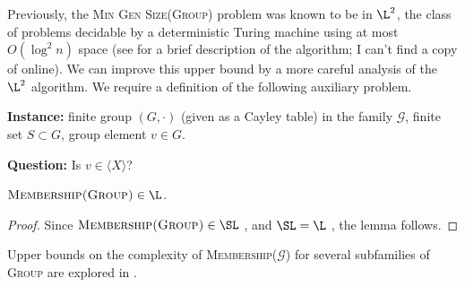 \documentclass{article}
\newcommand{\gen}[1]{{\langle #1 \rangle}}
\begin{document}


Previously, the \textsc{Min Gen Size(Group)} problem was known to be in $\L^2$, the class of problems decidable by a deterministic Turing machine using at most $O(\log^2 n)$ space \cite{lsz77} (see \cite[Proposition~3]{at06} for a brief description of the algorithm; I can't find a copy of \cite{lsz77} online).
We can improve this upper bound by a more careful analysis of the $\L^2$ algorithm.
We require a definition of the following auxiliary problem.

\begin{definition}
  \mbox{}

  \textbf{Instance:} finite group $(G, \cdot)$ (given as a Cayley table) in the family $\mathcal{G}$, finite set $S \subset G$, group element $v \in G$.

  \textbf{Question:} Is $v \in \gen{X}$?
\end{definition}

\begin{lemma}\label{lem:membershipinl}
  $\textsc{Membership(Group)} \in \L$.
\end{lemma}
\begin{proof}
  Since $\textsc{Membership(Group)} \in \SL$ \cite[Section~3]{bm89}, and $\SL = \L$ \cite{reingold08}, the lemma follows.
\end{proof}

Upper bounds on the complexity of \textsc{Membership($\mathcal{G}$)} for several subfamilies of \textsc{Group} are explored in \cite{bklm01}.
\end{document}
